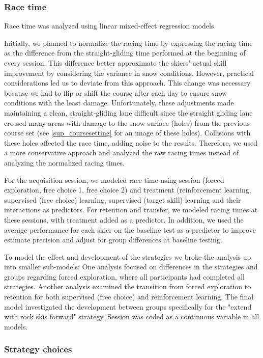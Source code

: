 \documentclass{article}
\begin{document}
 \subsubsection{Race time}

Race time was analyzed using linear mixed-effect regression models. 

Initially, we planned to normalize the racing time by expressing the racing time as the difference from the straight-gliding time performed at the beginning of every session. This difference better approximate the skiers' actual skill improvement by considering the variance in snow conditions. However, practical considerations led us to deviate from this approach. This change was necessary because we had to flip or shift the course after each day to ensure snow conditions with the least damage. Unfortunately, these adjustments made maintaining a clean, straight-gliding lane difficult since the straight gliding lane crossed many areas with damage to the snow surface (holes) from the previous course set (see \ref{sup_coursesetting} for an image of these holes). Collisions with these holes affected the race time, adding noise to the results. Therefore, we used a more conservative approach and analyzed the raw racing times instead of analyzing the normalized racing times.

For the acquisition session, we modeled race time using session (forced exploration, free choice 1, free choice 2) and treatment (reinforcement learning, supervised (free choice) learning, supervised (target skill) learning and their interactions as predictors. For retention and transfer, we modeled racing times at these sessions, with treatment added as a predictor. In addition, we used the average performance for each skier on the baseline test as a predictor to improve estimate precision and adjust for group differences at baseline testing. 

To model the effect and development of the strategies we broke the analysis up into smaller sub-models: One analysis focused on differences in the strategies and groups regarding forced exploration, where all participants had completed all strategies. Another analysis examined the transition from forced exploration to retention for both supervised (free choice) and reinforcement learning. The final model investigated the development between groups specifically for the "extend with rock skis forward" strategy. Session was coded as a continuous variable in all models. 


\subsubsection{Strategy choices}
\end{document}
